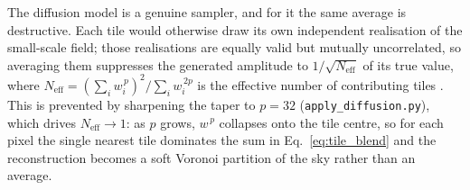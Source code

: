 \documentclass{report}
\begin{document}
The diffusion model is a genuine sampler, and for it the same average is destructive. Each tile would otherwise draw its own independent realisation of the small-scale field; those realisations are equally valid but mutually uncorrelated, so averaging them suppresses the generated amplitude to \mbox{$1/\sqrt{N_{\mathrm{eff}}}$} of its true value, where \mbox{$N_{\mathrm{eff}} = (\sum_i w_i^{\,p})^2 / \sum_i w_i^{\,2p}$} is the effective number of contributing tiles \cite{wiegand_kish_1968}. This is prevented by sharpening the taper to \mbox{$p=32$} (\texttt{apply\_diffusion.py}), which drives \mbox{$N_{\mathrm{eff}} \to 1$}: as \mbox{$p$} grows, \mbox{$w^{\,p}$} collapses onto the tile centre, so for each pixel the single nearest tile dominates the sum in Eq.~\eqref{eq:tile_blend} and the reconstruction becomes a soft Voronoi partition of the sky rather than an average.
\end{document}
